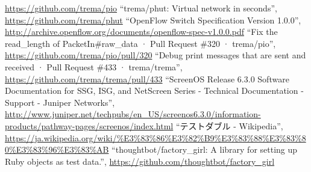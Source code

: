 \begin{thebibliography}{99}
         \url{https://github.com/trema/pio}
         ``trema/phut: Virtual network in seconds'',
         \url{https://github.com/trema/phut}
         ``OpenFlow Switch Specification Version 1.0.0'',
         \url{http://archive.openflow.org/documents/openflow-spec-v1.0.0.pdf}
  ``Fix the read\_length of PacketIn\#raw\_data ·
         Pull Request \#320 · trema/pio'',
         \url{https://github.com/trema/pio/pull/320}
  ``Debug print messages that are sent and received
         · Pull Request \#433 · trema/trema'',
         \url{https://github.com/trema/trema/pull/433}
  ``ScreenOS Release 6.3.0 Software
         Documentation for SSG, ISG, and NetScreen Series - Technical
         Documentation - Support - Juniper Networks'',
         \url{http://www.juniper.net/techpubs/en_US/screenos6.3.0/information-products/pathway-pages/screenos/index.html}
  ``テストダブル - Wikipedia'',
         \url{https://ja.wikipedia.org/wiki/%E3%83%86%E3%82%B9%E3%83%88%E3%83%80%E3%83%96%E3%83%AB}
  ``thoughtbot/factory\_girl: A library for setting
         up Ruby objects as test data.'',
         \url{https://github.com/thoughtbot/factory_girl}
\end{thebibliography}

